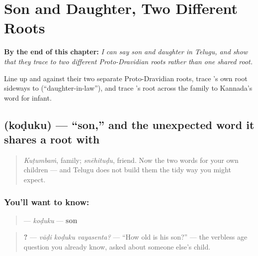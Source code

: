 
\chapter{Son and Daughter, Two Different Roots}
\label{ch:te-son-and-daughter}

\begin{chapteropening}
\textbf{By the end of this chapter:} \emph{I can say son and daughter in Telugu, and show that they trace to two different Proto-Dravidian roots rather than one shared root.}

Line up  and  against their two separate Proto-Dravidian roots, trace 's own root sideways to  (\textquotedblleft{}daughter-in-law\textquotedblright{}), and trace 's root across the family to Kannada's word for infant.
\end{chapteropening}

\section[\texorpdfstring{\te{కొడుకు} (koḍuku)}{కొడుకు (koḍuku)}]{ (koḍuku) — \textquotedblleft{}son,\textquotedblright{} and the unexpected word it shares a root with}

\label{lesson:TE-C36-koduku}



\begin{quote}
\emph{Kuṭumbaṁ}, family; \emph{snēhituḍu}, friend. Now the two words for your own children — and Telugu does not build them the tidy way you might expect.
\end{quote}

\subsection*{You'll want to know: }
\begin{quote}
\textbf{} — \emph{koḍuku} — \textbf{son}
\end{quote}

\begin{quote}
\textbf{  ?} — \emph{vāḍi koḍuku vayasenta?} — \textquotedblleft{}How old is his son?\textquotedblright{} — the verbless age question you already know, asked about someone else's child.
\end{quote}

